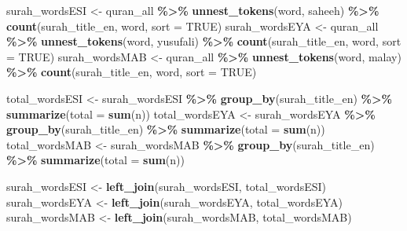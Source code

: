 \documentclass[
]{article}
\newenvironment{Shaded}{\begin{snugshade}}{\end{snugshade}}
\newcommand{\AttributeTok}[1]{\textcolor[rgb]{0.13,0.29,0.53}{#1}}
\newcommand{\ConstantTok}[1]{\textcolor[rgb]{0.56,0.35,0.01}{#1}}
\newcommand{\FunctionTok}[1]{\textcolor[rgb]{0.13,0.29,0.53}{\textbf{#1}}}
\newcommand{\NormalTok}[1]{#1}
\newcommand{\OtherTok}[1]{\textcolor[rgb]{0.56,0.35,0.01}{#1}}
\newcommand{\SpecialCharTok}[1]{\textcolor[rgb]{0.81,0.36,0.00}{\textbf{#1}}}
\begin{document}
\begin{Shaded}
\begin{Highlighting}[]
\NormalTok{surah\_wordsESI }\OtherTok{\textless{}{-}}\NormalTok{ quran\_all }\SpecialCharTok{\%\textgreater{}\%}
  \FunctionTok{unnest\_tokens}\NormalTok{(word, saheeh) }\SpecialCharTok{\%\textgreater{}\%} 
  \FunctionTok{count}\NormalTok{(surah\_title\_en, word, }\AttributeTok{sort =} \ConstantTok{TRUE}\NormalTok{)}
\NormalTok{surah\_wordsEYA }\OtherTok{\textless{}{-}}\NormalTok{ quran\_all }\SpecialCharTok{\%\textgreater{}\%}
  \FunctionTok{unnest\_tokens}\NormalTok{(word, yusufali) }\SpecialCharTok{\%\textgreater{}\%} 
  \FunctionTok{count}\NormalTok{(surah\_title\_en, word, }\AttributeTok{sort =} \ConstantTok{TRUE}\NormalTok{)}
\NormalTok{surah\_wordsMAB }\OtherTok{\textless{}{-}}\NormalTok{ quran\_all }\SpecialCharTok{\%\textgreater{}\%}
  \FunctionTok{unnest\_tokens}\NormalTok{(word, malay) }\SpecialCharTok{\%\textgreater{}\%} 
  \FunctionTok{count}\NormalTok{(surah\_title\_en, word, }\AttributeTok{sort =} \ConstantTok{TRUE}\NormalTok{)}

\NormalTok{total\_wordsESI }\OtherTok{\textless{}{-}}\NormalTok{ surah\_wordsESI }\SpecialCharTok{\%\textgreater{}\%} 
  \FunctionTok{group\_by}\NormalTok{(surah\_title\_en) }\SpecialCharTok{\%\textgreater{}\%} \FunctionTok{summarize}\NormalTok{(}\AttributeTok{total =} \FunctionTok{sum}\NormalTok{(n))}
\NormalTok{total\_wordsEYA }\OtherTok{\textless{}{-}}\NormalTok{ surah\_wordsEYA }\SpecialCharTok{\%\textgreater{}\%} 
  \FunctionTok{group\_by}\NormalTok{(surah\_title\_en) }\SpecialCharTok{\%\textgreater{}\%} \FunctionTok{summarize}\NormalTok{(}\AttributeTok{total =} \FunctionTok{sum}\NormalTok{(n))}
\NormalTok{total\_wordsMAB }\OtherTok{\textless{}{-}}\NormalTok{ surah\_wordsMAB }\SpecialCharTok{\%\textgreater{}\%} 
  \FunctionTok{group\_by}\NormalTok{(surah\_title\_en) }\SpecialCharTok{\%\textgreater{}\%} \FunctionTok{summarize}\NormalTok{(}\AttributeTok{total =} \FunctionTok{sum}\NormalTok{(n))}

\NormalTok{surah\_wordsESI }\OtherTok{\textless{}{-}} \FunctionTok{left\_join}\NormalTok{(surah\_wordsESI, total\_wordsESI)}
\NormalTok{surah\_wordsEYA }\OtherTok{\textless{}{-}} \FunctionTok{left\_join}\NormalTok{(surah\_wordsEYA, total\_wordsEYA)}
\NormalTok{surah\_wordsMAB }\OtherTok{\textless{}{-}} \FunctionTok{left\_join}\NormalTok{(surah\_wordsMAB, total\_wordsMAB)}
\end{Highlighting}
\end{Shaded}

\normalsize
\end{document}
